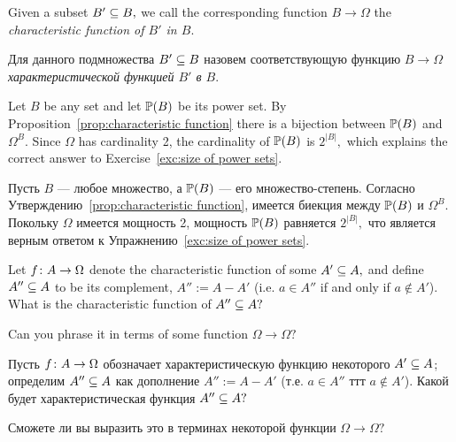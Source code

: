\documentclass[CT4S-EN-RU]{subfiles}
\begin{document}
\begin{definitionENG}
Given a subset $B'\ss B,$ we call the corresponding function $B\to\Omega$ the {\em characteristic function of $B'$ in $B.$}
\end{definitionENG}

\begin{definitionRUS}
Для данного подмножества $B'\ss B$ назовем соответствующую функцию $B\to\Omega$ {\em характеристической функцией $B'$ в $B.$}
\end{definitionRUS}

\begin{blockENG}
Let $B$ be any set and let $\PP(B)$ be its power set. By Proposition~\ref{prop:characteristic function} there is a bijection between $\PP(B)$ and $\Omega^B.$ Since $\Omega$ has cardinality 2, the cardinality of $\PP(B)$ is $2^{|B|},$ which explains the correct answer to Exercise~\ref{exc:size of power sets}.
\end{blockENG}

\begin{blockRUS}
Пусть $B$ — любое множество, а $\PP(B)$ — его множество-степень. Согласно Утверждению~\ref{prop:characteristic function}, имеется биекция между $\PP(B)$ и $\Omega^B.$ Покольку $\Omega$ имеется мощность 2, мощность $\PP(B)$ равняется $2^{|B|},$ что является верным ответом к Упражнению~\ref{exc:size of power sets}.
\end{blockRUS}

\begin{exerciseENG}
Let $f\taking A\to\Omega$ denote the characteristic function of some $A'\ss A,$ and define $A''\ss A$ to be its complement, $A'':=A-A'$ (i.e. $a\in A''$ if and only if $a\not\in A'$). 
\sexc What is the characteristic function of $A''\ss A?$ 
\item Can you phrase it in terms of some function $\Omega\to\Omega?$
\endsexc
\end{exerciseENG}

\begin{exerciseRUS}
Пусть $f\taking A\to\Omega$ обозначает характеристическую функцию некоторого $A'\ss A$; определим $A''\ss A$ как дополнение $A'':=A-A'$ (т.е. $a\in A''$ ттт $a\not\in A'$). 
\sexc Какой будет характеристическая функция $A''\ss A?$ 
\item Сможете ли вы выразить это в терминах некоторой функции $\Omega\to\Omega?$
\endsexc
\end{exerciseRUS}
\end{document}
